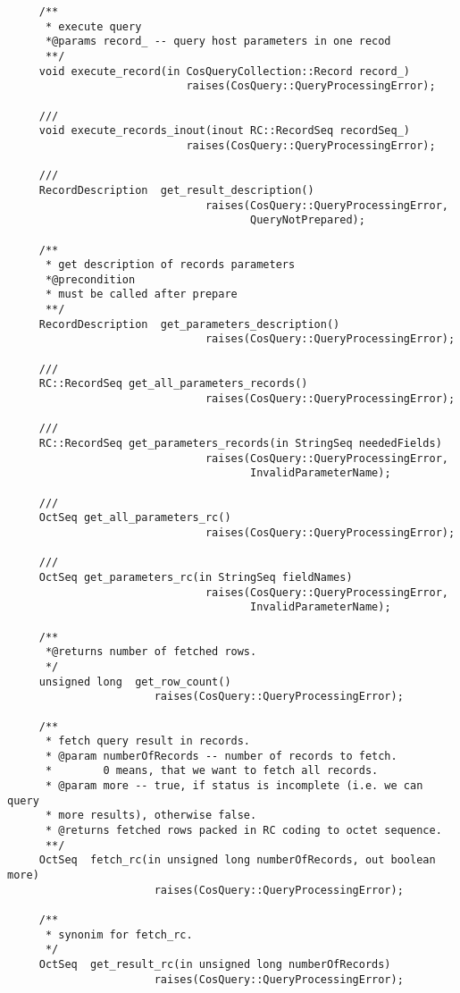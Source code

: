 \documentclass[10pt]{article}
\begin{document}
\begin{verbatim}
     /**
      * execute query
      *@params record_ -- query host parameters in one recod
      **/
     void execute_record(in CosQueryCollection::Record record_)
                            raises(CosQuery::QueryProcessingError);

     ///
     void execute_records_inout(inout RC::RecordSeq recordSeq_)
                            raises(CosQuery::QueryProcessingError);
     
     ///
     RecordDescription  get_result_description() 
                               raises(CosQuery::QueryProcessingError, 
                                      QueryNotPrepared);

     /**
      * get description of records parameters
      *@precondition
      * must be called after prepare
      **/
     RecordDescription  get_parameters_description()
                               raises(CosQuery::QueryProcessingError);

     ///
     RC::RecordSeq get_all_parameters_records() 
                               raises(CosQuery::QueryProcessingError);

     ///
     RC::RecordSeq get_parameters_records(in StringSeq neededFields)
                               raises(CosQuery::QueryProcessingError,
                                      InvalidParameterName);

     ///
     OctSeq get_all_parameters_rc() 
                               raises(CosQuery::QueryProcessingError);

     ///
     OctSeq get_parameters_rc(in StringSeq fieldNames)
                               raises(CosQuery::QueryProcessingError,
                                      InvalidParameterName);

     /**
      *@returns number of fetched rows.
      */
     unsigned long  get_row_count()
                       raises(CosQuery::QueryProcessingError);

     /**
      * fetch query result in records.
      * @param numberOfRecords -- number of records to fetch.
      *        0 means, that we want to fetch all records.
      * @param more -- true, if status is incomplete (i.e. we can query
      * more results), otherwise false.
      * @returns fetched rows packed in RC coding to octet sequence.
      **/
     OctSeq  fetch_rc(in unsigned long numberOfRecords, out boolean more)
                       raises(CosQuery::QueryProcessingError);

     /**
      * synonim for fetch_rc.
      */
     OctSeq  get_result_rc(in unsigned long numberOfRecords)
                       raises(CosQuery::QueryProcessingError);



\end{verbatim}
\end{document}
